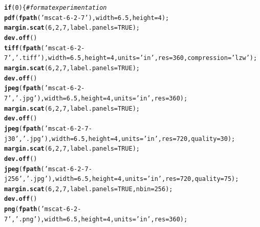 \documentclass{article}\usepackage[]{graphicx}\usepackage[]{color}
\makeatletter
\newcommand{\hlnum}[1]{\textcolor[rgb]{0.686,0.059,0.569}{#1}}%
\newcommand{\hlstr}[1]{\textcolor[rgb]{0.192,0.494,0.8}{#1}}%
\newcommand{\hlcom}[1]{\textcolor[rgb]{0.678,0.584,0.686}{\textit{#1}}}%
\newcommand{\hlstd}[1]{\textcolor[rgb]{0.345,0.345,0.345}{#1}}%
\newcommand{\hlkwa}[1]{\textcolor[rgb]{0.161,0.373,0.58}{\textbf{#1}}}%
\newcommand{\hlkwc}[1]{\textcolor[rgb]{0.333,0.667,0.333}{#1}}%
\newcommand{\hlkwd}[1]{\textcolor[rgb]{0.737,0.353,0.396}{\textbf{#1}}}%
\newenvironment{kframe}{%
 \def\at@end@of@kframe{}%
 \ifinner\ifhmode%
  \def\at@end@of@kframe{\end{minipage}}%
  \begin{minipage}{\columnwidth}%
 \fi\fi%
 \def\FrameCommand##1{\hskip\@totalleftmargin \hskip-\fboxsep
 \colorbox{shadecolor}{##1}\hskip-\fboxsep
     \hskip-\linewidth \hskip-\@totalleftmargin \hskip\columnwidth}%
 \MakeFramed {\advance\hsize-\width
   \@totalleftmargin\z@ \linewidth\hsize
   \@setminipage}}%
 {\par\unskip\endMakeFramed%
 \at@end@of@kframe}
\newenvironment{knitrout}{}{} %
\makeatother
\begin{document}
\begin{knitrout}\footnotesize
{}\color{fgcolor}\begin{kframe}
\begin{alltt}
\hlkwa{if}\hlstd{(}\hlnum{0}\hlstd{)\{} \hlcom{# format experimentation}
  \hlkwd{pdf}\hlstd{(}\hlkwd{fpath}\hlstd{(}\hlstr{'mscat-6-2-7'}\hlstd{),} \hlkwc{width}\hlstd{=}\hlnum{6.5}\hlstd{,} \hlkwc{height}\hlstd{=}\hlnum{4}\hlstd{);}
  \hlkwd{margin.scat}\hlstd{(}\hlnum{6}\hlstd{,}\hlnum{2}\hlstd{,}\hlnum{7}\hlstd{,}\hlkwc{label.panels}\hlstd{=}\hlnum{TRUE}\hlstd{);}
  \hlkwd{dev.off}\hlstd{()}
  \hlkwd{tiff}\hlstd{(}\hlkwd{fpath}\hlstd{(}\hlstr{'mscat-6-2-7'}\hlstd{,}\hlstr{'.tiff'}\hlstd{),} \hlkwc{width}\hlstd{=}\hlnum{6.5}\hlstd{,} \hlkwc{height}\hlstd{=}\hlnum{4}\hlstd{,}\hlkwc{units}\hlstd{=}\hlstr{'in'}\hlstd{,}\hlkwc{res}\hlstd{=}\hlnum{360}\hlstd{,}\hlkwc{compression}\hlstd{=}\hlstr{'lzw'}\hlstd{);}
  \hlkwd{margin.scat}\hlstd{(}\hlnum{6}\hlstd{,}\hlnum{2}\hlstd{,}\hlnum{7}\hlstd{,}\hlkwc{label.panels}\hlstd{=}\hlnum{TRUE}\hlstd{);}
  \hlkwd{dev.off}\hlstd{()}
  \hlkwd{jpeg}\hlstd{(}\hlkwd{fpath}\hlstd{(}\hlstr{'mscat-6-2-7'}\hlstd{,}\hlstr{'.jpg'}\hlstd{),} \hlkwc{width}\hlstd{=}\hlnum{6.5}\hlstd{,} \hlkwc{height}\hlstd{=}\hlnum{4}\hlstd{,}\hlkwc{units}\hlstd{=}\hlstr{'in'}\hlstd{,}\hlkwc{res}\hlstd{=}\hlnum{360}\hlstd{);}
  \hlkwd{margin.scat}\hlstd{(}\hlnum{6}\hlstd{,}\hlnum{2}\hlstd{,}\hlnum{7}\hlstd{,}\hlkwc{label.panels}\hlstd{=}\hlnum{TRUE}\hlstd{);}
  \hlkwd{dev.off}\hlstd{()}
  \hlkwd{jpeg}\hlstd{(}\hlkwd{fpath}\hlstd{(}\hlstr{'mscat-6-2-7-j30'}\hlstd{,}\hlstr{'.jpg'}\hlstd{),} \hlkwc{width}\hlstd{=}\hlnum{6.5}\hlstd{,} \hlkwc{height}\hlstd{=}\hlnum{4}\hlstd{,}\hlkwc{units}\hlstd{=}\hlstr{'in'}\hlstd{,}\hlkwc{res}\hlstd{=}\hlnum{720}\hlstd{,}\hlkwc{quality}\hlstd{=}\hlnum{30}\hlstd{);}
  \hlkwd{margin.scat}\hlstd{(}\hlnum{6}\hlstd{,}\hlnum{2}\hlstd{,}\hlnum{7}\hlstd{,}\hlkwc{label.panels}\hlstd{=}\hlnum{TRUE}\hlstd{);}
  \hlkwd{dev.off}\hlstd{()}
  \hlkwd{jpeg}\hlstd{(}\hlkwd{fpath}\hlstd{(}\hlstr{'mscat-6-2-7-j256'}\hlstd{,}\hlstr{'.jpg'}\hlstd{),} \hlkwc{width}\hlstd{=}\hlnum{6.5}\hlstd{,} \hlkwc{height}\hlstd{=}\hlnum{4}\hlstd{,}\hlkwc{units}\hlstd{=}\hlstr{'in'}\hlstd{,}\hlkwc{res}\hlstd{=}\hlnum{720}\hlstd{,}\hlkwc{quality}\hlstd{=}\hlnum{75}\hlstd{);}
  \hlkwd{margin.scat}\hlstd{(}\hlnum{6}\hlstd{,}\hlnum{2}\hlstd{,}\hlnum{7}\hlstd{,}\hlkwc{label.panels}\hlstd{=}\hlnum{TRUE}\hlstd{,}\hlkwc{nbin}\hlstd{=}\hlnum{256}\hlstd{);}
  \hlkwd{dev.off}\hlstd{()}
  \hlkwd{png}\hlstd{(}\hlkwd{fpath}\hlstd{(}\hlstr{'mscat-6-2-7'}\hlstd{,}\hlstr{'.png'}\hlstd{),} \hlkwc{width}\hlstd{=}\hlnum{6.5}\hlstd{,} \hlkwc{height}\hlstd{=}\hlnum{4}\hlstd{,}\hlkwc{units}\hlstd{=}\hlstr{'in'}\hlstd{,}\hlkwc{res}\hlstd{=}\hlnum{360}\hlstd{);}

\end{alltt}
\end{kframe}
\end{knitrout}
\end{document}
